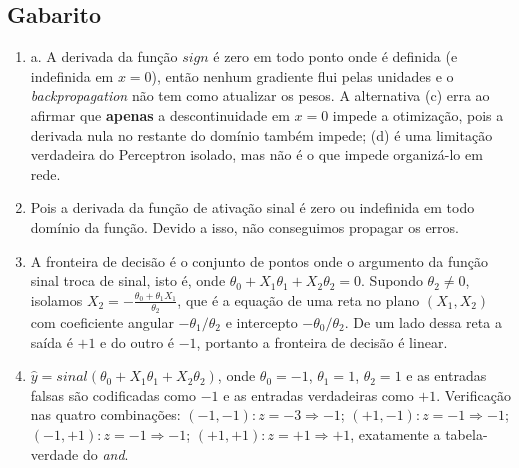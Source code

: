 \documentclass{dlproblemset}
\begin{document}
\subsection*{Gabarito}
\color{blue}
\begin{enumerate}[1)]

    \item a. A derivada da função $sign$ é zero em todo ponto onde é definida (e indefinida em $x=0$), então nenhum gradiente flui pelas unidades e o \textit{backpropagation} não tem como atualizar os pesos. A alternativa (c) erra ao afirmar que \textbf{apenas} a descontinuidade em $x=0$ impede a otimização, pois a derivada nula no restante do domínio também impede; (d) é uma limitação verdadeira do Perceptron isolado, mas não é o que impede organizá-lo em rede.

    \item Pois a derivada da função de ativação sinal é zero ou indefinida em todo domínio da função. Devido a isso, não conseguimos propagar os erros.

    \item A fronteira de decisão é o conjunto de pontos onde o argumento da função sinal troca de sinal, isto é, onde $\theta_0 + X_1\theta_1 + X_2\theta_2=0$. Supondo $\theta_2 \neq 0$, isolamos $X_2 = -\frac{\theta_0 + \theta_1 X_1}{\theta_2}$, que é a equação de uma reta no plano $(X_1, X_2)$ com coeficiente angular $-\theta_1/\theta_2$ e intercepto $-\theta_0/\theta_2$. De um lado dessa reta a saída é $+1$ e do outro é $-1$, portanto a fronteira de decisão é linear.

    \item $\hat{y}=sinal(\theta_0 + X_1\theta_1 + X_2\theta_2)$, onde $\theta_0=-1$, $\theta_1=1$, $\theta_2=1$ e as entradas falsas são codificadas como $-1$ e as entradas verdadeiras como $+1$. Verificação nas quatro combinações: $(-1,-1)\!: z=-3 \Rightarrow -1$; $(+1,-1)\!: z=-1 \Rightarrow -1$; $(-1,+1)\!: z=-1 \Rightarrow -1$; $(+1,+1)\!: z=+1 \Rightarrow +1$, exatamente a tabela-verdade do \textit{and}.


\end{enumerate}
\end{document}
